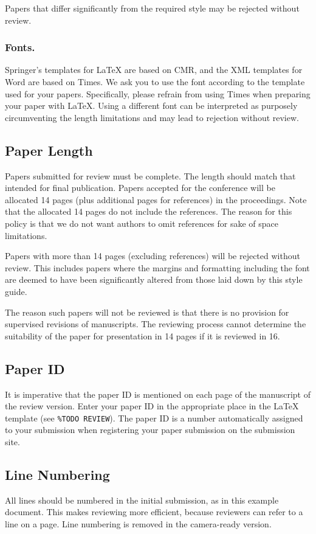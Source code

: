 \documentclass[runningheads]{llncs}
\begin{document}
Papers that differ significantly from the required style may be rejected without review.


\subsubsection{Fonts.}
Springer's templates for \LaTeX{} are based on CMR, and the XML templates for Word are based on Times. 
We ask you to use the font according to the template used for your papers. 
Specifically, please refrain from using Times when preparing your paper with \LaTeX{}.
Using a different font can be interpreted as purposely circumventing the length limitations and may lead to rejection without review.


\subsection{Paper Length}
Papers submitted for review must be complete. 
The length should match that intended for final publication. 
Papers accepted for the conference will be allocated 14 pages (plus additional pages for references) in the proceedings. 
Note that the allocated 14 pages do not include the references. 
The reason for this policy is that we do not want authors to omit references for sake of space limitations.

Papers with more than 14 pages (excluding references) will be rejected without review.
This includes papers where the margins and formatting including the font are deemed to have been significantly altered from those laid down by this style guide.

The reason such papers will not be reviewed is that there is no provision for supervised revisions of manuscripts. 
The reviewing process cannot determine the suitability of the paper for presentation in 14 pages if it is reviewed in 16.


\subsection{Paper ID}
It is imperative that the paper ID is mentioned on each page of the manuscript of the review version.
Enter your paper ID in the appropriate place in the \LaTeX{} template (see \texttt{\%TODO REVIEW}).
The paper ID is a number automatically assigned to your submission when registering your paper submission on the submission site.


\subsection{Line Numbering}
\label{sec:line-numbering}
All lines should be numbered in the initial submission, as in this example document. 
This makes reviewing more efficient, because reviewers can refer to a line on a page. 
Line numbering is removed in the camera-ready version.
\end{document}
